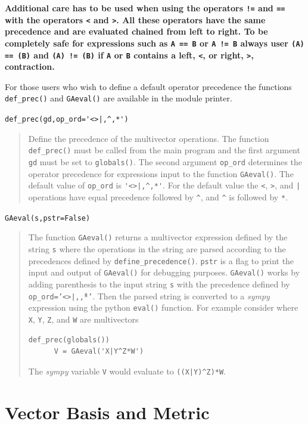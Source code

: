 \documentclass[12pt]{report}
\newcommand{\T}[1]{\texttt{#1}}
\begin{document}
    \textbf{Additional care has to be used when using the operators \T{!=} and \T{==} with
    the operators \T{<} and \T{>}.  All these operators have the same precedence and are
    evaluated chained from left to right.  To be completely safe for expressions such as
    \T{A == B} or \T{A != B} always user \T{(A) == (B)} and \T{(A) != (B)} if \T{A} or \T{B}
    contains a left, \T{<}, or right, \T{>}, contraction.}

For those users who wish to define a default operator precedence the functions
\T{def\_prec()} and \T{GAeval()} are available in the module printer.

   \lstinline$def_prec(gd,op_ord='<>|,^,*')$
   \begin{quote}
   Define the precedence of the multivector operations.  The function
   \T{def\_prec()} must be called from the main program and the
   first argument \T{gd} must be set to \T{globals()}.  The second argument
   \T{op\_ord} determines the operator precedence for expressions input to
   the function \T{GAeval()}. The default value of \T{op\_ord} is \lstinline$'<>|,^,*'$.
   For the default value the \T{<}, \T{>}, and \T{|} operations have equal
   precedence followed by \T{\^}, and \T{\^} is followed by \T{*}.
   \end{quote}

   \T{GAeval(s,pstr=False)}
   \begin{quote}
   The function \T{GAeval()} returns a multivector expression defined by the
   string \T{s} where the operations in the string are parsed according to
   the precedences defined by \T{define\_precedence()}. \T{pstr} is a flag
   to print the input and output of \T{GAeval()} for debugging purposes.
   \T{GAeval()} works by adding parenthesis to the input string \T{s} with the
   precedence defined by \T{op\_ord='<>|,\^,*'}.  Then the parsed string is
   converted to a \emph{sympy} expression using the python \T{eval()} function.
   For example consider where \T{X}, \T{Y}, \T{Z}, and \T{W} are multivectors

    \begin{lstlisting}[numbers=none]
      def_prec(globals())
      V = GAeval('X|Y^Z*W')
    \end{lstlisting}

   The \emph{sympy} variable \T{V} would evaluate to \lstinline!((X|Y)^Z)*W!.
   \end{quote}

\section{Vector Basis and Metric}\label{BasisMetric}
\end{document}
